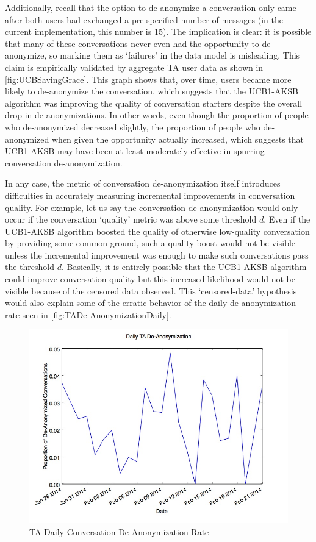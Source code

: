 Additionally, recall that the option to de-anonymize a conversation only came after both users had exchanged a pre-specified number of messages (in the current implementation, this number is 15). The implication is clear: it is possible that many of these conversations never even had the opportunity to de-anonymize, so marking them as `failures' in the data model is misleading. This claim is empirically validated by aggregate TA user data as shown in \autoref{fig:UCBSavingGrace}. This graph shows that, over time, users became more likely to de-anonymize the conversation, which suggests that the UCB1-AKSB algorithm was improving the quality of conversation starters despite the overall drop in de-anonymizations. In other words, even though the proportion of people who de-anonymized decreased slightly, the proportion of people who de-anonymized when given the opportunity actually increased, which suggests that UCB1-AKSB may have been at least moderately effective in spurring conversation de-anonymization.

In any case, the metric of conversation de-anonymization itself introduces difficulties in accurately measuring incremental improvements in conversation quality. For example, let us say the conversation de-anonymization would only occur if the conversation `quality' metric was above some threshold $d$. Even if the UCB1-AKSB algorithm boosted the quality of otherwise low-quality conversation by providing some common ground, such a quality boost would not be visible unless the incremental improvement was enough to make such conversations pass the threshold $d$. Basically, it is entirely possible that the UCB1-AKSB algorithm could improve conversation quality but this increased likelihood would not be visible because of the censored data observed. This `censored-data' hypothesis would also explain some of the erratic behavior of the daily de-anonymization rate seen in \autoref{fig:TADe-AnonymizationDaily}.

\begin{figure}[H]
\centering
\includegraphics[trim= 0mm 0mm 0mm 0mm, clip, scale=0.5]{./Figures/DailyTADe-Anonymization.jpg}
\caption{TA Daily Conversation De-Anonymization Rate}
\label{fig:TADe-AnonymizationDaily}
\end{figure}

